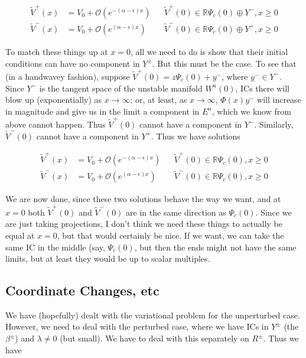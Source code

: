 \documentclass[12pt]{article}
\def\R{{\mathbb R}}
\begin{document}
\begin{align*}
\tilde{V}^+(x) &= V_0 + \mathcal{O}(e^{-(\alpha - \epsilon)x}) && \tilde{V}^+(0) \in \R \Psi_c(0) \oplus Y^-, x \geq 0 \\
\tilde{V}^-(x) &= V_0 + \mathcal{O}(e^{(\alpha - \epsilon)x}) && \tilde{V}^-(0) \in \R \Psi_c(0) \oplus Y^+, x \geq 0
\end{align*}

To match these things up at $x = 0$, all we need to do is show that their initial conditions can have no component in $Y^\pm$. But this must be the case. To see that (in a handwavey fashion), suppose $\tilde{V}^+(0) = z \Psi_c(0) + y^-$, where $y^- \in Y^-$. Since $Y^-$ is the tangent space of the unstable manifold $W^u(0)$, ICs there will blow up (exponentially) as $x \rightarrow \infty$; or, at least, as $x \rightarrow \infty$, $\Phi(x)y^-$ will increase in magnitude and give us in the limit a component in $E^u$, which we know from above cannot happen. Thus $\tilde{V}^+(0)$ cannot have a component in $Y^-$. Similarly, $\tilde{V}^-(0)$ cannot have a component in $Y^+$. Thus we have solutions 

\begin{align*}
\tilde{V}^+(x) &= V_0 + \mathcal{O}(e^{-(\alpha - \epsilon)x}) && \tilde{V}^+(0) \in \R \Psi_c(0), x \geq 0 \\
\tilde{V}^-(x) &= V_0 + \mathcal{O}(e^{(\alpha - \epsilon)x}) && \tilde{V}^-(0) \in \R \Psi_c(0), x \geq 0
\end{align*}

We are now done, since these two solutions behave the way we want, and at $x = 0$ both $\tilde{V}^+(0)$ and $\tilde{V}^-(0)$ are in the same direction as $\Psi_c(0)$. Since we are just taking projections, I don't think we need these things to actually be equal at $x = 0$, but that would certainly be nice. If we want, we can take the same IC in the middle (say, $\Psi_c(0)$, but then the ends might not have the same limits, but at least they would be up to scalar multiples.

\subsection{Coordinate Changes, etc}

We have (hopefully) dealt with the variational problem for the unperturbed case. However, we need to deal with the perturbed case, where we have ICs in $Y^\pm$ (the $\beta^\pm$) and $\lambda \neq 0$ (but small). We have to deal with this separately on $R^\pm$. Thus we have
\end{document}
